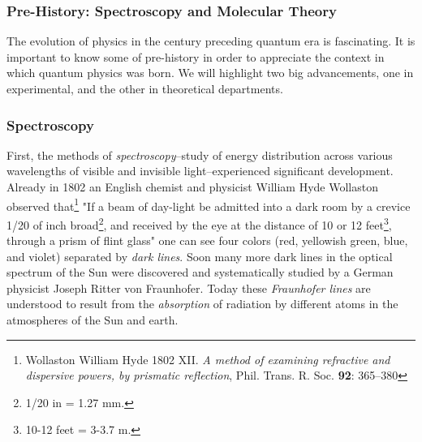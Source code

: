 \subsubsection*{Pre-History: Spectroscopy and Molecular Theory}
The evolution of physics in the century preceding quantum era is fascinating. It is important to know some of pre-history in order to appreciate the context in which quantum physics was born. We will highlight two big advancements, one in experimental, and the other in theoretical departments. 

\subsubsection*{Spectroscopy}
First, the methods of \emph{spectroscopy}--study of energy distribution across various wavelengths of visible and invisible light--experienced significant development. Already in 1802 an English chemist and physicist William Hyde Wollaston observed that\footnote{Wollaston William Hyde 1802 XII. \emph{A method of examining refractive and dispersive powers, by prismatic reflection}, Phil. Trans. R. Soc. {\bf 92}: 365–380 } "If a beam of day-light be admitted into a dark room by a crevice 1/20 of inch broad\footnote{1/20 in = 1.27 mm.}, and received by the eye at the distance of 10 or 12 feet\footnote{10-12 feet = 3-3.7 m.}, through a prism of flint glass" one can see four colors (red, yellowish green, blue, and violet) separated by \emph{dark lines}. Soon many more dark lines in the optical spectrum of the Sun were discovered and systematically studied by a German physicist Joseph Ritter von Fraunhofer. Today these \emph{Fraunhofer lines} are understood to result from the \emph{absorption} of radiation by different atoms in the atmospheres of the Sun and earth.
